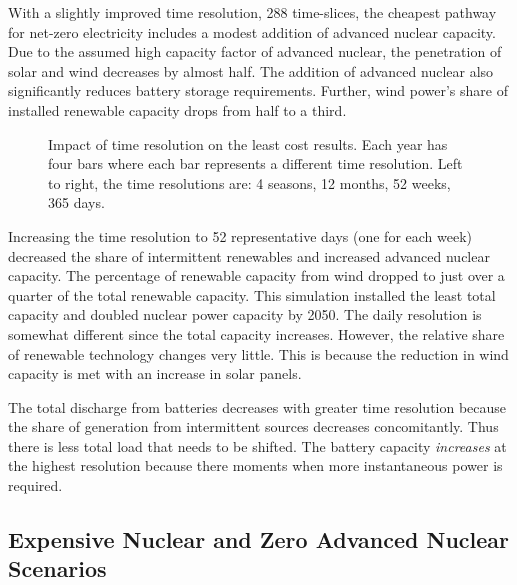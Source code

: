 With a slightly improved time resolution, 288 time-slices, the cheapest pathway
for net-zero electricity includes a modest addition of advanced nuclear capacity.
Due to the assumed high capacity factor of advanced nuclear, the penetration of
solar and wind decreases by almost half. The addition of advanced nuclear also significantly
reduces battery storage requirements. Further, wind power's share of installed renewable
capacity drops from half to a third.

\begin{figure}[H]
  \centering
  \resizebox{0.95\columnwidth}{!}{}
  \caption{Impact of time resolution on the least cost results. Each year has four bars where
  each bar represents a different time resolution. Left to right, the time resolutions are: 4
  seasons, 12 months, 52 weeks, 365 days.}
  \label{fig:time_res_LC}
\end{figure}

Increasing the time resolution to 52 representative days (one for
each week) decreased the share of intermittent renewables and increased advanced
nuclear capacity. The percentage of renewable capacity from wind dropped to
just over a quarter of the total renewable capacity. This simulation installed
the least total capacity and doubled nuclear power capacity by 2050.
The daily resolution is somewhat different since the total capacity increases.
However, the relative share of renewable technology changes very little. This is
because the reduction in wind capacity is met with an increase in solar
panels.

The total discharge from batteries decreases with greater time resolution because
the share of generation from intermittent sources decreases concomitantly. Thus
there is less total load that needs to be shifted. The battery capacity \textit{increases}
at the highest resolution because there moments when more instantaneous power is
required.

\subsection{Expensive Nuclear and Zero Advanced Nuclear Scenarios}

